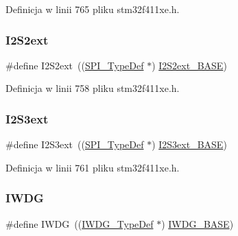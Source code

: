 Definicja w linii 765 pliku stm32f411xe.\+h.

\mbox{\label{group___peripheral__declaration_ga9efe6de71871a01dd38abcb229f30c02}} 
\subsubsection{\texorpdfstring{I2\+S2ext}{I2S2ext}}
{\footnotesize\ttfamily \#define I2\+S2ext~((\hyperlink{struct_s_p_i___type_def}{S\+P\+I\+\_\+\+Type\+Def} $\ast$) \hyperlink{group___peripheral__memory__map_gaa5f7b241ed5b756decd835300c9e7bc9}{I2\+S2ext\+\_\+\+B\+A\+SE})}



Definicja w linii 758 pliku stm32f411xe.\+h.

\mbox{\label{group___peripheral__declaration_ga15b3a03302ed53911099c5216da0b1cf}} 
\subsubsection{\texorpdfstring{I2\+S3ext}{I2S3ext}}
{\footnotesize\ttfamily \#define I2\+S3ext~((\hyperlink{struct_s_p_i___type_def}{S\+P\+I\+\_\+\+Type\+Def} $\ast$) \hyperlink{group___peripheral__memory__map_ga89b61d6e6b09e94f3fccb7bef34e0263}{I2\+S3ext\+\_\+\+B\+A\+SE})}



Definicja w linii 761 pliku stm32f411xe.\+h.

\mbox{\label{group___peripheral__declaration_gad16b79dd94ee85d261d08a8ee94187e7}} 
\subsubsection{\texorpdfstring{I\+W\+DG}{IWDG}}
{\footnotesize\ttfamily \#define I\+W\+DG~((\hyperlink{struct_i_w_d_g___type_def}{I\+W\+D\+G\+\_\+\+Type\+Def} $\ast$) \hyperlink{group___peripheral__memory__map_ga8543ee4997296af5536b007cd4748f55}{I\+W\+D\+G\+\_\+\+B\+A\+SE})}



